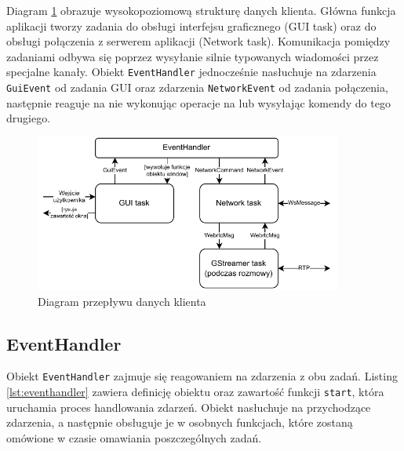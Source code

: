 Diagram \ref{fig:client_data_flow} obrazuje wysokopoziomową strukturę danych klienta. Główna funkcja
aplikacji tworzy zadania do obsługi interfejsu graficznego (GUI task) oraz do obsługi połączenia z
serwerem aplikacji (Network task). Komunikacja pomiędzy zadaniami odbywa się poprzez wysyłanie
silnie typowanych wiadomości przez specjalne kanały. Obiekt \verb|EventHandler| jednocześnie
nasłuchuje na zdarzenia \verb|GuiEvent| od zadania GUI oraz zdarzenia \verb|NetworkEvent| od zadania
połączenia, następnie reaguje na nie wykonując operacje na lub wysyłając komendy do tego drugiego.

\begin{figure}[H]
    \centering
    \includegraphics[width=0.9\textwidth]{img/implementacja/client_data_flow}
    \caption{Diagram przepływu danych klienta}
    \label{fig:client_data_flow}
\end{figure}

\subsection{EventHandler}

Obiekt \verb|EventHandler| zajmuje się reagowaniem na zdarzenia z obu zadań. Listing
\ref{lst:eventhandler} zawiera definicję obiektu oraz zawartość funkcji \verb|start|, która
uruchamia proces handlowania zdarzeń. Obiekt nasłuchuje na przychodzące zdarzenia, a następnie
obsługuje je w osobnych funkcjach, które zostaną omówione w czasie omawiania poszczególnych zadań.

